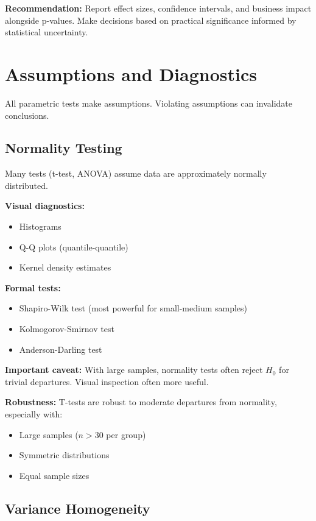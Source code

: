 \textbf{Recommendation:} Report effect sizes, confidence intervals, and business impact alongside p-values. Make decisions based on practical significance informed by statistical uncertainty.

\section{Assumptions and Diagnostics}

All parametric tests make assumptions. Violating assumptions can invalidate conclusions.

\subsection{Normality Testing}

Many tests (t-test, ANOVA) assume data are approximately normally distributed.

\textbf{Visual diagnostics:}
\begin{itemize}
    \item Histograms
    \item Q-Q plots (quantile-quantile)
    \item Kernel density estimates
\end{itemize}

\textbf{Formal tests:}
\begin{itemize}
    \item Shapiro-Wilk test (most powerful for small-medium samples)
    \item Kolmogorov-Smirnov test
    \item Anderson-Darling test
\end{itemize}

\textbf{Important caveat:} With large samples, normality tests often reject $H_0$ for trivial departures. Visual inspection often more useful.

\textbf{Robustness:} T-tests are robust to moderate departures from normality, especially with:
\begin{itemize}
    \item Large samples ($n > 30$ per group)
    \item Symmetric distributions
    \item Equal sample sizes
\end{itemize}

\subsection{Variance Homogeneity}

